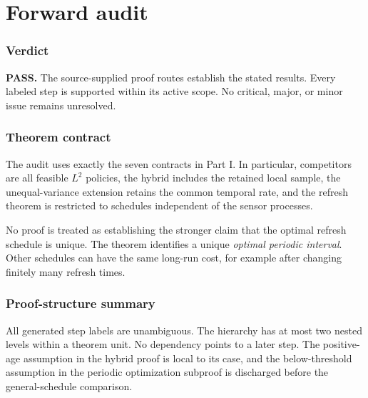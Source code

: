 \documentclass[11pt,letterpaper]{article}
\begin{document}
\clearpage
\part{Forward audit}
\section{Verdict}
\textbf{PASS.} The source-supplied proof routes establish the stated results. Every labeled step is supported within its active scope. No critical, major, or minor issue remains unresolved.

\section{Theorem contract}
The audit uses exactly the seven contracts in Part I. In particular, competitors are all feasible $L^2$ policies, the hybrid includes the retained local sample, the unequal-variance extension retains the common temporal rate, and the refresh theorem is restricted to schedules independent of the sensor processes.

No proof is treated as establishing the stronger claim that the optimal refresh schedule is unique. The theorem identifies a unique \emph{optimal periodic interval}. Other schedules can have the same long-run cost, for example after changing finitely many refresh times.

\section{Proof-structure summary}
All generated step labels are unambiguous. The hierarchy has at most two nested levels within a theorem unit. No dependency points to a later step. The positive-age assumption in the hybrid proof is local to its case, and the below-threshold assumption in the periodic optimization subproof is discharged before the general-schedule comparison.
\end{document}
